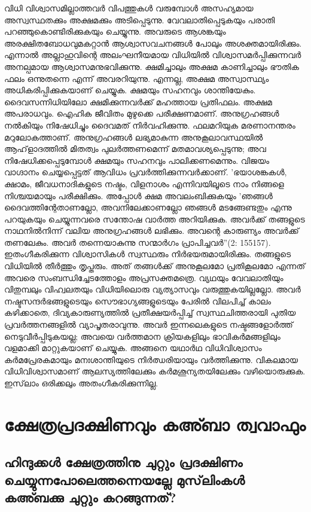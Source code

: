 വിധി വിശ്വാസമില്ലാത്തവര്‍ വിപത്തുകള്‍ വരുമ്പോള്‍ അസഹ്യമായ അസ്വസ്ഥതക്കും അക്ഷമക്കും അടിപ്പെടുന്നു. വേവലാതിപ്പെടുകയും പരാതി പറഞ്ഞുകൊണ്ടിരിക്കുകയും ചെയ്യുന്നു. അവരുടെ ആശങ്കയും അരക്ഷിതബോധവുമകറ്റാന്‍ ആശ്വാസവചനങ്ങള്‍ പോലും അശക്തമായിരിക്കും. എന്നാല്‍ അല്ലാഹുവിന്റെ അലംഘനീയമായ വിധിയില്‍ വിശ്വാസമര്‍പ്പിക്കുന്നവര്‍ അനല്പമായ ആശ്വാസമനുഭവിക്കുന്നു. ക്ഷമിച്ചാലും അക്ഷമ കാണിച്ചാലും ഭൗതിക ഫലം ഒന്നുതന്നെ എന്ന് അവരറിയുന്നു. എന്നല്ല, അക്ഷമ അസ്വാസ്ഥ്യം അധികരിപ്പിക്കുകയാണ് ചെയ്യുക. ക്ഷമയും സഹനവും ശാന്തിയേകും. ദൈവസന്നിധിയിലോ ക്ഷമിക്കുന്നവര്‍ക്ക് മഹത്തായ പ്രതിഫലം. അക്ഷമ അപരാധവും. ഐഹിക ജീവിതം മുഴുക്കെ പരീക്ഷണമാണ്. അനുഗ്രഹങ്ങള്‍ നല്‍കിയും നിഷേധിച്ചും ദൈവമത് നിര്‍വഹിക്കുന്നു. ഫലമറിയുക മരണാനന്തരം മറുലോകത്താണ്. അനുഗ്രഹങ്ങള്‍ ലഭ്യമാകുന്ന അനുകൂലാവസ്ഥയില്‍ ആഹ്‌ളാദത്തില്‍ മിതത്വം പുലര്‍ത്തണമെന്ന് മതമാവശ്യപ്പെടുന്നു; അവ നിഷേധിക്കപ്പെടുമ്പോള്‍ ക്ഷമയും സഹനവും പാലിക്കണമെന്നും. വിജയം വാഗ്ദാനം ചെയ്യപ്പെട്ടത് ആവിധം പ്രവര്‍ത്തിക്കുന്നവര്‍ക്കാണ്.
'ഭയാശങ്കകള്‍, ക്ഷാമം, ജീവധനാദികളുടെ നഷ്ടം, വിളനാശം എന്നിവയിലൂടെ നാം നിങ്ങളെ നിശ്ചയമായും പരീക്ഷിക്കും. അപ്പോള്‍ ക്ഷമ അവലംബിക്കുകയും 'ഞങ്ങള്‍ ദൈവത്തിന്റേതാണല്ലോ, അവനിലേക്കാണല്ലോ ഞങ്ങള്‍ മടങ്ങേണ്ടതും എന്നു പറയുകയും ചെയ്യുന്നവരെ സന്തോഷ വാര്‍ത്ത അറിയിക്കുക. അവര്‍ക്ക് തങ്ങളുടെ നാഥനില്‍നിന്ന് വലിയ അനുഗ്രഹങ്ങള്‍ ലഭിക്കും. അവന്റെ കാരുണ്യം അവര്‍ക്ക് തണലേകും. അവര്‍ തന്നെയാകുന്നു സന്മാര്‍ഗം പ്രാപിച്ചവര്‍''(2: 155157).
ഇതംഗീകരിക്കുന്ന വിശ്വാസികള്‍ സ്വസ്ഥരും നിര്‍ഭയരുമായിരിക്കും. തങ്ങളുടെ വിധിയില്‍ തീര്‍ത്തും തൃപ്തരും. അത് തങ്ങള്‍ക്ക് അനുകൂലമോ പ്രതികൂലമോ എന്നത് അവരെ സംബന്ധിച്ചേടത്തോളം അപ്രസക്തമത്രെ. വ്യഥയും വേവലാതിയും വിതുമ്പലും വിഹ്വലതയും വിധിയിലൊരു വ്യത്യാസവും വരുത്തുകയില്ലല്ലോ. അവര്‍ നഷ്ടസന്ദര്‍ഭങ്ങളുടെയും സൌഭാഗ്യങ്ങളുടെയും പേരില്‍ വിലപിച്ച് കാലം കഴിക്കാതെ, ദിവ്യകാരുണ്യത്തില്‍ പ്രതീക്ഷയര്‍പ്പിച്ച് സ്വസ്ഥചിത്തരായി പുതിയ പ്രവര്‍ത്തനങ്ങളില്‍ വ്യാപൃതരാവുന്നു. അവര്‍ ഇന്നലെകളുടെ നഷ്ടങ്ങളോര്‍ത്ത് നെടുവീര്‍പ്പിടുകയല്ല; അവയെ വര്‍ത്തമാന ക്രിയകളിലും ഭാവികര്‍മങ്ങളിലും വളമാക്കി മാറ്റുകയാണ് ചെയ്യുക. അങ്ങനെ യഥാര്‍ഥ വിധിവിശ്വാസം കര്‍മപ്രേരകമായും മനഃശാന്തിയുടെ നിര്‍ഝരിയായും വര്‍ത്തിക്കുന്നു. വികലമായ വിധിവിശ്വാസമാണ് ആലസ്യത്തിലേക്കും കര്‍മശൂന്യതയിലേക്കും വഴിയൊരുക്കുക. ഇസ്‌ലാം ഒരിക്കലും അതംഗീകരിക്കുന്നില്ല.


\chapter{ക്ഷേത്രപ്രദക്ഷിണവും കഅ്ബാ ത്വവാഫും} 
 \section{ ഹിന്ദുക്കള്‍ ക്ഷേത്രത്തിനു ചുറ്റും പ്രദക്ഷിണം ചെയ്യുന്നപോലെത്തന്നെയല്ലേ മുസ്‌ലിംകള്‍ കഅ്ബക്കു ചുറ്റും കറങ്ങുന്നത്?}

